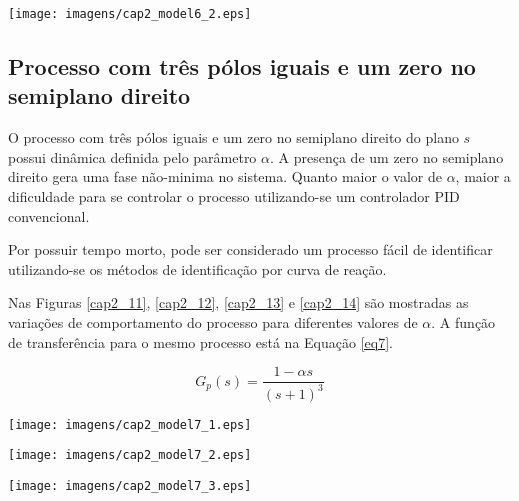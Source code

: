     \begin{center}
        \texttt{[image: imagens/cap2\_model6\_2.eps]}
        \label{cap2_10}
    \end{center}

\subsection{Processo com três pólos iguais e um zero no semiplano direito}

    O processo com três pólos iguais e um zero no semiplano direito do plano $s$
    possui dinâmica definida pelo parâmetro $\alpha$. A presença de um
    zero no semiplano direito gera uma fase não-minima no sistema. Quanto maior
    o valor de $\alpha$, maior a dificuldade para se controlar o processo
    utilizando-se um controlador \acs{PID} convencional.
    
    Por possuir tempo morto, pode ser considerado um processo fácil de identificar
    utilizando-se os métodos de identificação por curva de reação.
    
    Nas Figuras \ref{cap2_11}, \ref{cap2_12}, \ref{cap2_13} e \ref{cap2_14}
    são mostradas as variações de comportamento do processo para diferentes
    valores de $\alpha$. A função de transferência para o mesmo processo
    está na Equação \ref{eq7}.

    \begin{equation}
        \label{eq7}
        G_p(s) = \frac{1-\alpha s}{(s+1)^3}
    \end{equation}

    \begin{center}
        \texttt{[image: imagens/cap2\_model7\_1.eps]}
        \label{cap2_11}
    \end{center}

    \begin{center}
        \texttt{[image: imagens/cap2\_model7\_2.eps]}
        \label{cap2_12}
    \end{center}
    
    \begin{center}
        \texttt{[image: imagens/cap2\_model7\_3.eps]}
        \label{cap2_13}
    \end{center}
    
